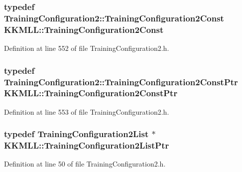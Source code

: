 \subsubsection[{\texorpdfstring{Training\+Configuration2\+Const}{TrainingConfiguration2Const}}]{\setlength{\rightskip}{0pt plus 5cm}typedef {\bf Training\+Configuration2\+::\+Training\+Configuration2\+Const} {\bf K\+K\+M\+L\+L\+::\+Training\+Configuration2\+Const}}\hypertarget{namespace_k_k_m_l_l_abec6237fd9c0112ff72b75b10d4b5696}{}\label{namespace_k_k_m_l_l_abec6237fd9c0112ff72b75b10d4b5696}


Definition at line 552 of file Training\+Configuration2.\+h.

\subsubsection[{\texorpdfstring{Training\+Configuration2\+Const\+Ptr}{TrainingConfiguration2ConstPtr}}]{\setlength{\rightskip}{0pt plus 5cm}typedef {\bf Training\+Configuration2\+::\+Training\+Configuration2\+Const\+Ptr} {\bf K\+K\+M\+L\+L\+::\+Training\+Configuration2\+Const\+Ptr}}\hypertarget{namespace_k_k_m_l_l_a7f2af9b6e9a0f9d0ac33c66c0856de35}{}\label{namespace_k_k_m_l_l_a7f2af9b6e9a0f9d0ac33c66c0856de35}


Definition at line 553 of file Training\+Configuration2.\+h.

\subsubsection[{\texorpdfstring{Training\+Configuration2\+List\+Ptr}{TrainingConfiguration2ListPtr}}]{\setlength{\rightskip}{0pt plus 5cm}typedef {\bf Training\+Configuration2\+List} $\ast$ {\bf K\+K\+M\+L\+L\+::\+Training\+Configuration2\+List\+Ptr}}\hypertarget{namespace_k_k_m_l_l_a77bfbdd70b510fed053cec865434ba28}{}\label{namespace_k_k_m_l_l_a77bfbdd70b510fed053cec865434ba28}


Definition at line 50 of file Training\+Configuration2.\+h.

